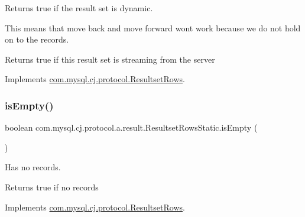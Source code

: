 Returns true if the result set is dynamic.

This means that move back and move forward won\textquotesingle{}t work because we do not hold on to the records.

\begin{DoxyReturn}{Returns}
true if this result set is streaming from the server 
\end{DoxyReturn}


Implements \mbox{\hyperlink{interfacecom_1_1mysql_1_1cj_1_1protocol_1_1_resultset_rows_aa9dd39e935202eca58365a9f0c166db8}{com.\+mysql.\+cj.\+protocol.\+Resultset\+Rows}}.

\mbox{\label{classcom_1_1mysql_1_1cj_1_1protocol_1_1a_1_1result_1_1_resultset_rows_static_a6e253f009ce83647195f60954d021cff}} 
\subsubsection{\texorpdfstring{is\+Empty()}{isEmpty()}}
{\footnotesize\ttfamily boolean com.\+mysql.\+cj.\+protocol.\+a.\+result.\+Resultset\+Rows\+Static.\+is\+Empty (\begin{DoxyParamCaption}{ }\end{DoxyParamCaption})}

Has no records.

\begin{DoxyReturn}{Returns}
true if no records 
\end{DoxyReturn}


Implements \mbox{\hyperlink{interfacecom_1_1mysql_1_1cj_1_1protocol_1_1_resultset_rows_ae130183c4bba57a93d3fe890f14b6c25}{com.\+mysql.\+cj.\+protocol.\+Resultset\+Rows}}.

\mbox{\label{classcom_1_1mysql_1_1cj_1_1protocol_1_1a_1_1result_1_1_resultset_rows_static_ad16947839519d3bf8c5bc679f6920b5c}} 
